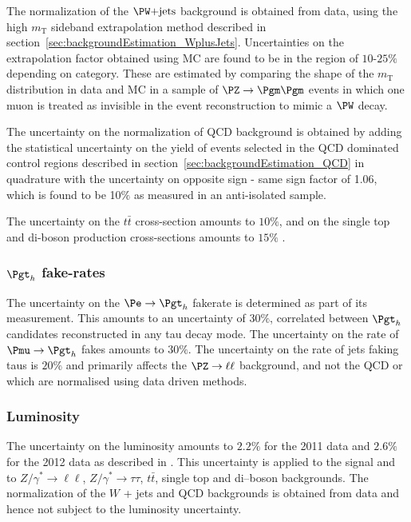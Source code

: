 The normalization of the $\WJets$ background is obtained from data, 
using the high $m_{\text{T}}$ sideband extrapolation method described in
section~\ref{sec:backgroundEstimation_WplusJets}. Uncertainties on the
extrapolation factor obtained using \ac{MC} are found to be in the region of
$10$-$25\%$ depending on category. These are estimated by comparing the shape of
the $m_{\text{T}}$ distribution in data and \ac{MC} in a sample of
$\PZ\to\Pgm\Pgm$ events in which one muon is treated as invisible in the event
reconstruction to mimic a $\PW$ decay. 

The uncertainty on the normalization of QCD background is obtained by adding the
statistical uncertainty on the yield of events selected in the QCD dominated control regions
described in section~\ref{sec:backgroundEstimation_QCD} in quadrature with the
uncertainty on opposite sign - same sign factor of 1.06, which is found to be
10$\%$ as measured in an anti-isolated sample.

The uncertainty on the $t \bar{t}$ cross-section amounts to $10\%$, and on the single top and di-boson
production cross-sections amounts to $15\%$ \cite{Chatrchyan:2013oev,Chatrchyan:2012ep}.
 
\subsubsection{\textbf{$\Pgt_{h}$ fake-rates}} 
The uncertainty on the $\Pe \to \Pgt_{h}$ fakerate is determined as part of
its measurement. This amounts to an uncertainty of $30\%$, correlated between
$\Pgt_{h}$ candidates reconstructed in any tau decay mode. 
The uncertainty on the rate of $\Pmu \to \Pgt_{h}$ fakes amounts to $30\%$.
The uncertainty on the rate of jets faking taus is $20\%$ and primarily affects
the $\PZ\to\ell\ell$ background, and not the QCD or \WJets which are normalised
using data driven methods.

\subsubsection{\textbf{Luminosity}} 
The uncertainty on the luminosity amounts to $2.2\%$ for the 2011 data and
$2.6\%$ for the 2012 data as described in \cite{CMS-PAS-SMP-12-008,CMS-PAS-LUM-13-001}.
This uncertainty is applied to the signal and to $Z/\gamma^{*} \to \ell\ell$, $Z/\gamma^{*} \to
\tau\tau$, $t \bar{t}$, single top and di--boson backgrounds. 
The normalization of the $W$ + jets and QCD backgrounds is obtained from data and hence not subject to the luminosity uncertainty.

